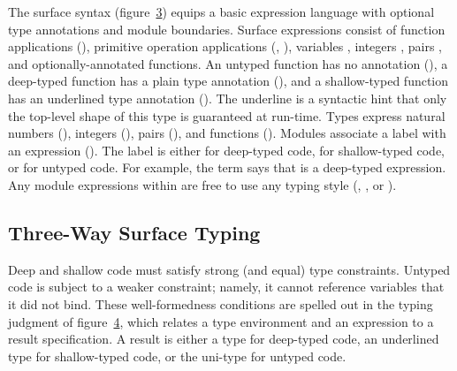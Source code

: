 \documentclass[screen=true, natbib=false, 10pt, sigplan]{acmart}
\let\SOriginalthesubsubsection\thesubsubsection
\newcommand{\Ssubsection}[2]{\subsection[#1]{#2}\let\thesubsubsection\SOriginalthesubsubsection}
\newcommand{\FigureRef}[2]{#1}
\begin{document}
The surface syntax (figure~\hyperref[t:x28counter_x28x22figurex22_x22figx3amodelx3asurfacex22x29x29]{\FigureRef{3}{t:x28counter_x28x22figurex22_x22figx3amodelx3asurfacex22x29x29}}) equips a basic expression
language with optional type annotations and module boundaries.
Surface expressions \relax{$\ssurface$} consist of function applications (\relax{$\eappu{\ssurface}{\ssurface}$}),
 primitive operation applications (\relax{$\eunop{\ssurface}$}, \relax{$\ebinop{\ssurface}{\ssurface}$}),
 variables \relax{$\svar$},
 integers \relax{$\sint$},
 pairs \relax{$\epair{\ssurface}{\ssurface}$},
 and optionally{-}annotated functions.
An untyped function has no annotation (\relax{$\efun{\svar}{\ssurface}$}),
 a deep{-}typed function has a plain type annotation (\relax{$\efun{\tann{\svar}{\stype}}{\ssurface}$}),
 and a shallow{-}typed function has an underlined type annotation (\relax{$\efun{\tann{\svar}{\tfloor{\stype}}}{\ssurface}$}).
The underline is a syntactic hint that only the top{-}level shape of this type is
guaranteed at run{-}time.
Types \relax{$\stype$} express natural numbers (\relax{$\tnat$}),
 integers (\relax{$\tint$}),
 pairs (\relax{$\tpair{\stype}{\stype}$}),
 and functions (\relax{$\tfun{\stype}{\stype}$}).
Modules associate a label with an expression (\relax{$\emod{\slang}{\ssurface}$}).
The label \relax{$\slang$} is either \relax{$\sD$} for deep{-}typed code,
 \relax{$\sS$} for shallow{-}typed code, or \relax{$\sU$} for untyped code.
For example, the term  says that 
is a deep{-}typed expression.
Any module expressions within  are free to use any
typing style (\relax{$\sD$}, \relax{$\sS$}, or \relax{$\sU$}).

\Ssubsection{Three{-}Way Surface Typing}{Three{-}Way Surface Typing}\label{t:x28part_x22secx3amodelx3amodelx3atypesx22x29}

Deep and shallow code must satisfy strong (and equal) type constraints.
Untyped code is subject to a weaker constraint; namely, it cannot reference
variables that it did not bind.
These well{-}formedness conditions are spelled out in the typing judgment
of figure~\hyperref[t:x28counter_x28x22figurex22_x22figx3amodelx3asurfacex2dtypex22x29x29]{\FigureRef{4}{t:x28counter_x28x22figurex22_x22figx3amodelx3asurfacex2dtypex22x29x29}}, which relates a type environment
\relax{$\stypeenv$} and an expression \relax{$\ssurface$} to a result specification.
A result \relax{$\stspec$} is either a type \relax{$\stype$} for deep{-}typed code,
an underlined type \relax{$\tfloor{\stype}$} for shallow{-}typed code,
or the uni{-}type \relax{$\tdyn$} for untyped code.
\end{document}
